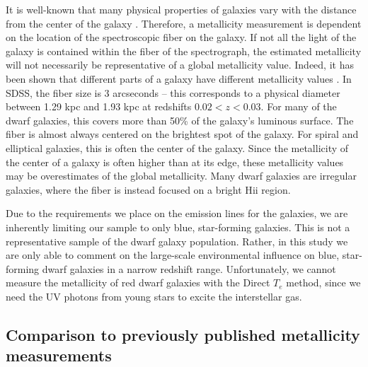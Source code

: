 It is well-known that many physical properties of galaxies vary with the 
distance from the center of the galaxy \citep{Bell00}.  Therefore, a metallicity 
measurement is dependent on the location of the spectroscopic fiber on the 
galaxy.  If not all the light of the galaxy is contained within the fiber of the 
spectrograph, the estimated metallicity will not necessarily be representative 
of a global metallicity value.  Indeed, it has been shown that different parts 
of a galaxy have different metallicity values \citep{Bell00}.  In SDSS, the 
fiber size is 3 arcseconds -- this corresponds to a physical diameter between 
1.29 kpc and 1.93 kpc at redshifts $0.02 < z < 0.03$.  For many of the dwarf 
galaxies, this covers more than 50\% of the galaxy's luminous surface.  The 
fiber is almost always centered on the brightest spot of the galaxy.  For spiral 
and elliptical galaxies, this is often the center of the galaxy.  Since 
the metallicity of the center of a galaxy is often higher than at its edge, 
these metallicity values may be overestimates of the global metallicity.  Many 
dwarf galaxies are irregular galaxies, where the fiber is instead focused on a 
bright H{\sc ii} region.

Due to the requirements we place on the emission lines for the galaxies, we are 
inherently limiting our sample to only blue, star-forming galaxies.  This is not 
a representative sample of the dwarf galaxy population.  Rather, in this study 
we are only able to comment on the large-scale environmental influence on blue, 
star-forming dwarf galaxies in a narrow redshift range.  Unfortunately, we 
cannot measure the metallicity of red dwarf galaxies with the Direct $T_e$ 
method, since we need the UV photons from young stars to excite the interstellar 
gas.



\subsection{Comparison to previously published metallicity measurements}

